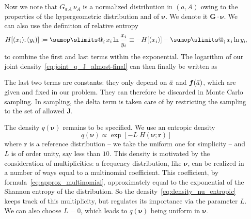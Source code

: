 \documentclass[\ifafour a4paper,12pt,\else a5paper,10pt,\fi%
onecolumn,oneside,article,%
british%
]{memoir}
\makeatletter
\newcommand*{\widefbox}[1]{\fbox{\hspace{1em}#1\hspace{1em}}}
\theoremstyle{remark}
\theoremstyle{innote}
\def\sum{\DOTSI\sumop\slimits@}
\newcommand*{\delt}{\deltaup}%
\newcommand*{\defd}{\coloneqq}
\newcommand*{\pf}{\mathrm{p}}%
\renewcommand*{\|}[1][]{\nonscript\,#1\vert\nonscript\;\mathopen{}}
\newcommand*{\tsum}{\mathop{\textstyle\sum}\nolimits}
\newcommand*{\widebar}[1]{{\mkern1.5mu\skew{2}\overline{\mkern-1.5mu#1\mkern-1.5mu}\mkern 1.5mu}}
\newcommand*{\yff}{f}
\newcommand*{\yf}{\bm{\yff}}
\newcommand*{\yas}{\widebar{a}}%
\newcommand*{\ynuu}{\nu}
\newcommand*{\ynu}{\bm{\ynuu}}
\newcommand*{\ysh}{H}
\newcommand*{\yeq}{\mathrel{\!=\!}}
\newcommand*{\yJJ}{J}
\newcommand*{\yJ}{\bm{\yJJ}}
\newcommand*{\yI}{\varIota}
\newcommand*{\yG}{\bm{G}}
\newcommand*{\yr}{\bm{r}}
\makeatother
\begin{document}
Now we note that $G_{a\,A}\,\nu_{A}$ is a normalized distribution in
$(a,A)$ owing to the properties of the hypergeometric distribution and of
$\ynu$. We denote it $\yG\cdot\ynu$. We can also use the definition of
relative entropy
\begin{equation}
  \label{eq:rel_entropy}
  \ysh[(x_{i}); (y_{i})] \defd \tsum_{i} x_{i} \ln\frac{x_{i}}{y_{i}}
\equiv -\ysh[(x_{i})] -\tsum_{i} x_{i} \ln y_{i},
\end{equation}
to combine the first and last terms within the exponential. The logarithm
of our joint density~\eqref{eq:joint_q_J_almost-final} can then finally be
written as

The last two terms are constants: they only depend on $\yas$ and
$\yf(\yas)$, which are given and fixed in our problem. They can therefore
be discarded in Monte Carlo sampling. In sampling, the delta term is taken
care of by restricting the sampling to the set of allowed $\yJ$.

\medskip

The density $q(\ynu)$ remains to be specified. We use an entropic density
\begin{equation}
  \label{eq:density_nu_entropic}
  q(\ynu) \propto \exp[-L\;\ysh(\ynu;\yr)]
\end{equation}
where $\yr$ is a reference distribution -- we take the uniform one for
simplicity -- and $L$ is of order unity, say less than $10$. This density
is motivated by the consideration of multiplicities: a frequency
distribution, like $\ynu$, can be realized in a number of ways equal to a
multinomial coefficient. This coefficient, by
formula~\eqref{eq:approx_multinomial}, approximately equal to the
exponential of the Shannon entropy of the distribution. So the
density~\eqref{eq:density_nu_entropic} keeps track of this multiplicity,
but regulates its importance via the parameter $L$. We can also choose
$L=0$, which leads to $q(\ynu)$ being uniform in $\ynu$.
\end{document}
